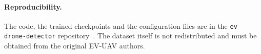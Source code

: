 \documentclass[11pt,a4paper]{article}
\begin{document}
\paragraph{Reproducibility.}
The code, the trained checkpoints and the configuration files are
in the \texttt{ev-drone-detector} repository~\cite{evdronedetector2026}.
The dataset itself is not redistributed and must be obtained from
the original EV-UAV authors.



\end{document}
